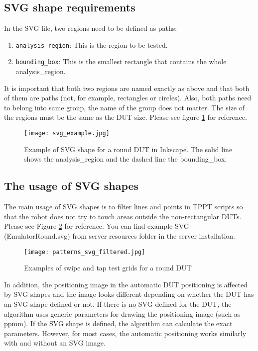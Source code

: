 \subsection{SVG shape requirements}
\label{sec:svg_shape_requirements}
In the SVG file, two regions need to be defined as paths:
\begin{enumerate}
	\item \texttt{analysis\_region}: This is the region to be tested.
	\item \texttt{bounding\_box}: This is the smallest rectangle that contains the whole analysis\_region. 
\end{enumerate}

It is important that both two regions are named exactly as above and that both of them are paths (not, for example, rectangles or circles). Also, both paths need to belong into same group, the name of the group does not matter. The size of the regions must be the same as the DUT size. Please see figure \ref{fig:svg_example} for reference. 

\begin{figure}[h]
	\centering
	\texttt{[image: svg\_example.jpg]}
	\caption{Example of SVG shape for a round DUT in Inkscape. The solid line shows the analysis\_region and the dashed line the bounding\_box.}
	\label{fig:svg_example}
\end{figure}


\subsection{The usage of SVG shapes}
The main usage of SVG shapes is to filter lines and points in TPPT scripts so that the robot does not try to touch areas outside the non-rectangular DUTs. Please see Figure \ref{fig:patterns_svg_filtered} for reference.  You can find example SVG (EmulatorRound.svg) from server resources folder in the server installation.

\begin{figure}[h]
	\centering
	\texttt{[image: patterns\_svg\_filtered.jpg]}
	\caption{Examples of swipe and tap test grids for a round DUT}
	\label{fig:patterns_svg_filtered}
\end{figure}

In addition, the positioning image in the automatic DUT positioning is affected by SVG shapes and the image looks different depending on whether the DUT has an SVG shape defined or not. If there is no SVG defined for the DUT, the algorithm uses generic parameters for drawing the positioning image (such as ppmm). If the SVG shape is defined, the algorithm can calculate the exact parameters. However, for most cases, the automatic positioning works similarly with and without an SVG image.

